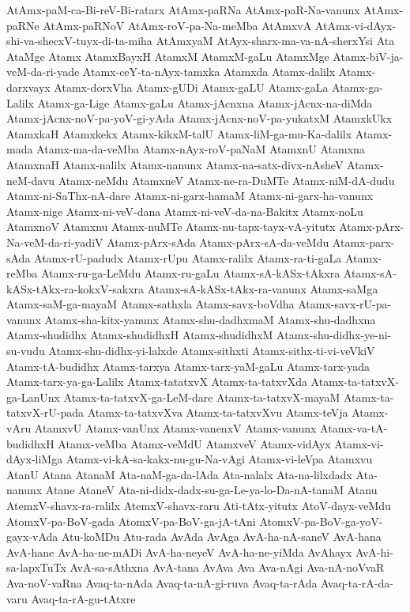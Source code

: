 {AtAmx-paM-ca-Bi-reV-Bi-ratarx
AtAmx-paRNa
AtAmx-paR-Na-vanunx
AtAmx-paRNe
AtAmx-paRNoV
AtAmx-roV-pa-Na-meMba
AtAmxvA
AtAmx-vi-dAyx-shi-va-shecxV-tuyx-di-ta-miha
AtAmxyaM
AtAyx-sharx-ma-va-nA-sherxYsi
Ata
AtaMge
Atamx
AtamxBayxH
AtamxM
AtamxM-gaLu
AtamxMge
Atamx-biV-ja-veM-da-ri-yade
Atamx-ceY-ta-nAyx-tamxka
Atamxda
Atamx-dalilx
Atamx-darxvayx
Atamx-dorxVha
Atamx-gUDi
Atamx-gaLU
Atamx-gaLa
Atamx-ga-Lalilx
Atamx-ga-Lige
Atamx-gaLu
Atamx-jAcnxna
Atamx-jAcnx-na-diMda
Atamx-jAcnx-noV-pa-yoV-gi-yAda
Atamx-jAcnx-noV-pa-yukatxM
AtamxkUkx
AtamxkaH
Atamxkekx
Atamx-kikxM-talU
Atamx-liM-ga-mu-Ka-dalilx
Atamx-mada
Atamx-ma-da-veMba
Atamx-nAyx-roV-paNaM
AtamxnU
Atamxna
AtamxnaH
Atamx-nalilx
Atamx-nanunx
Atamx-na-satx-divx-nAsheV
Atamx-neM-davu
Atamx-neMdu
AtamxneV
Atamx-ne-ra-DuMTe
Atamx-niM-dA-dudu
Atamx-ni-SaThx-nA-dare
Atamx-ni-garx-hamaM
Atamx-ni-garx-ha-vanunx
Atamx-nige
Atamx-ni-veV-dana
Atamx-ni-veV-da-na-Bakitx
Atamx-noLu
AtamxnoV
Atamxnu
Atamx-nuMTe
Atamx-nu-tapx-tayx-vA-yitutx
Atamx-pArx-Na-veM-da-ri-yadiV
Atamx-pArx-sAda
Atamx-pArx-sA-da-veMdu
Atamx-parx-sAda
Atamx-rU-padudx
Atamx-rUpu
Atamx-ralilx
Atamx-ra-ti-gaLa
Atamx-reMba
Atamx-ru-ga-LeMdu
Atamx-ru-gaLu
Atamx-sA-kASx-tAkxra
Atamx-sA-kASx-tAkx-ra-kokxV-sakxra
Atamx-sA-kASx-tAkx-ra-vanunx
Atamx-saMga
Atamx-saM-ga-mayaM
Atamx-sathxla
Atamx-savx-boVdha
Atamx-savx-rU-pa-vanunx
Atamx-sha-kitx-yanunx
Atamx-shu-dadhxmaM
Atamx-shu-dadhxna
Atamx-shudidhx
Atamx-shudidhxH
Atamx-shudidhxM
Atamx-shu-didhx-ye-ni-su-vudu
Atamx-shu-didhx-yi-lalxde
Atamx-sithxti
Atamx-sithx-ti-vi-veVkiV
Atamx-tA-budidhx
Atamx-tarxya
Atamx-tarx-yaM-gaLu
Atamx-tarx-yada
Atamx-tarx-ya-ga-Lalilx
Atamx-tatatxvX
Atamx-ta-tatxvXda
Atamx-ta-tatxvX-ga-LanUnx
Atamx-ta-tatxvX-ga-LeM-dare
Atamx-ta-tatxvX-mayaM
Atamx-ta-tatxvX-rU-pada
Atamx-ta-tatxvXva
Atamx-ta-tatxvXvu
Atamx-teVja
Atamx-vAru
AtamxvU
Atamx-vanUnx
Atamx-vanenxV
Atamx-vanunx
Atamx-va-tA-budidhxH
Atamx-veMba
Atamx-veMdU
AtamxveV
Atamx-vidAyx
Atamx-vi-dAyx-liMga
Atamx-vi-kA-sa-kakx-nu-gu-Na-vAgi
Atamx-vi-leVpa
Atamxvu
AtanU
Atana
AtanaM
Ata-naM-ga-da-lAda
Ata-nalalx
Ata-na-lilxdadx
Ata-nanunx
Atane
AtaneV
Ata-ni-didx-dadx-su-ga-Le-ya-lo-Da-nA-tanaM
Atanu
AtemxV-shavx-ra-ralilx
AtemxV-shavx-raru
Ati-tAtx-yitutx
AtoV-dayx-veMdu
AtomxV-pa-BoV-gada
AtomxV-pa-BoV-ga-jA-tAni
AtomxV-pa-BoV-ga-yoV-gayx-vAda
Atu-koMDu
Atu-rada
AvAda
AvAga
AvA-ha-nA-saneV
AvA-hana
AvA-hane
AvA-ha-ne-mADi
AvA-ha-neyeV
AvA-ha-ne-yiMda
AvAhayx
AvA-hi-sa-lapxTuTx
AvA-sa-sAthxna
AvA-tana
AvAva
Ava
Ava-nAgi
Ava-nA-noVvaR
Ava-noV-vaRna
Avaq-ta-nAda
Avaq-ta-nA-gi-ruva
Avaq-ta-rAda
Avaq-ta-rA-da-varu
Avaq-ta-rA-gu-tAtxre
}
